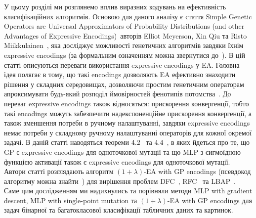 У цьому розділі ми розглянемо вплив виразних кодувань на ефективність класифікаційних алгоритмів. Основою для даного аналізу є стаття \glqq Simple Genetic Operators are Universal Approximators of Probability Distributions (and other Advantages of Expressive Encodings)\grqq\ авторів Elliot Meyerson, Xin Qiu та Risto Miikkulainen~\cite{ct25}, яка досліджує можливості генетичних алгоритмів завдяки їхнім expressive encodings (за формальним означенням можна звернутися до~\cite[Definition 1, стор. 3]{ct25}). В цій статті описуються переваги використання expressive encodings у EA. Головна ідея полягає в тому, що такі encodings дозволяють EA ефективно знаходити рішення у складних середовищах, дозволяючи простим генетичним операторам~\cite[підрозділ 2.2.3, стор. 3]{ct25} апроксимувати будь-який розподіл ймовірностей фенотипів потомства~\cite[розділ 2.1, стор. 2]{ct25}. До переваг expressive encodings також відносяться: прискорення конвергенції, тобто такі encodings можуть забезпечити надекспоненційне прискорення конвергенції, а також зменшення потреби в ручному налаштуванні, завдяки expressive encodings немає потреби у складному ручному налаштуванні операторів для кожної окремої задачі. В даній статті наводяться теореми 4.2~\cite[Theorem 4.2]{ct25} та 4.4~\cite[Theorem 4.4]{ct25}, в яких йдеться про те, що GP є expressive encodings для одноточкової мутації та що MLP з сигмоїдною функцією активації також є expressive encodings для одноточкової мутації. Автори статті розглядають алгоритм $(1+\lambda)$-EA with GP encodings (псевдокод алгоритму можна знайти~\cite[Appendix B, стор. 12]{ct25}) для вирішення проблем DFC~\cite[Problem 1, стор. 6]{ct25}, RFC~\cite[Problem 2, стор. 7]{ct25} та LBAP~\cite[Problem 3, стор. 7]{ct25}. Саме цим дослідженням ми надихнулись та порівняли методи MLP with gradient descent, MLP with single-point mutation та $(1+\lambda)$-EA with GP encodings для задач бінарної та багатокласової класифікації табличних даних та картинок.

\chapconclude{\ref{chap:theory}}

